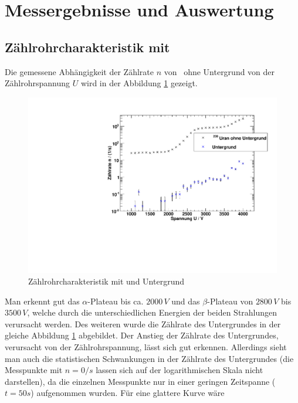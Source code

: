 \section{Messergebnisse und Auswertung}

\subsection{Zählrohrcharakteristik mit \uran}
\label{sub:eval:uran}
Die gemessene Abhängigkeit der Zählrate $n$ von \uran\, ohne Untergrund von der Zählrohrspannung $U$ wird in der Abbildung \ref{img:char:uran} gezeigt.
\begin{figure}[H]
\begin{center}
  \includegraphics[width=15cm]{../img/Uran238_Charakteristik.pdf}
  \caption[Zählrohrcharakteristik mit \uran]{Zählrohrcharakteristik mit \uran und Untergrund}
  \label{img:char:uran}
\end{center}
\end{figure}
Man erkennt gut das $\alpha$-Plateau bis ca. $2000\,V$ und das $\beta$-Plateau von $2800\,V$ bis $3500\,V$, welche durch die 
unterschiedlichen Energien der beiden Strahlungen verursacht werden. Des weiteren wurde die Zählrate des Untergrundes in der gleiche Abbildung 
\ref{img:char:uran} abgebildet. Der Anstieg der Zählrate des Untergrundes, verursacht von der Zählrohrspannung, lässt sich gut erkennen. Allerdings 
sieht man auch die statistischen Schwankungen in der Zählrate des Untergrundes (die Messpunkte mit $n = 0 / s$ lassen sich auf der logarithmischen 
Skala nicht darstellen), da die einzelnen Messpunkte nur in einer geringen Zeitspanne ($t=50s$) aufgenommen wurden. Für eine glattere Kurve wäre 
